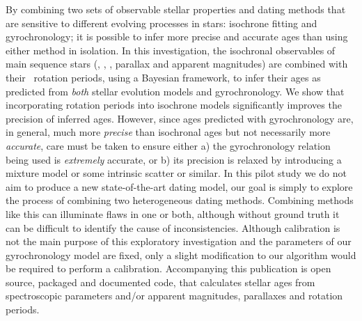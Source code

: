
By combining two sets of observable stellar properties and dating methods that
are sensitive to different evolving processes in stars: isochrone fitting and
gyrochronology; it is possible to infer more precise and accurate ages than
using either method in isolation.
In this investigation, the isochronal observables of main sequence stars
(\teff, \feh, \logg, parallax and apparent magnitudes) are combined with their
\kepler\ rotation periods, using a Bayesian framework, to infer their ages as
predicted from {\it both} stellar evolution models and gyrochronology.
We show that incorporating rotation periods into isochrone models
significantly improves the precision of inferred ages.
However, since ages predicted with gyrochronology are, in general, much more
{\it precise} than isochronal ages but not necessarily more {\it accurate},
care must be taken to ensure either a) the gyrochronology relation being used
is {\it extremely} accurate, or b) its precision is relaxed by introducing a
mixture model or some intrinsic scatter or similar.
In this pilot study we do not aim to produce a new state-of-the-art dating
model, our goal is simply to explore the process of combining two
heterogeneous dating methods.
Combining methods like this can illuminate flaws in one or both, although
without ground truth it can be difficult to identify the cause of
inconsistencies.
Although calibration is not the main purpose of this exploratory investigation
and the parameters of our gyrochronology model are fixed, only a slight
modification to our algorithm would be required to perform a calibration.
Accompanying this publication is open source, packaged and documented code,
that calculates stellar ages from spectroscopic parameters and/or apparent
magnitudes, parallaxes and rotation periods.

